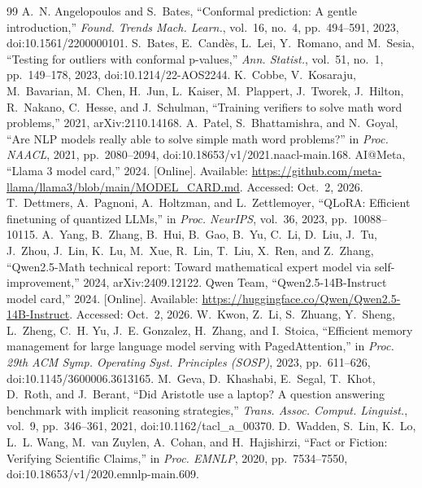 \documentclass[journal]{IEEEtran}
\begin{document}
\begin{thebibliography}{99}
 A.~N. Angelopoulos and S.~Bates, ``Conformal prediction: A gentle introduction,'' \emph{Found. Trends Mach. Learn.}, vol.~16, no.~4, pp.~494--591, 2023, doi:10.1561/2200000101.
 S.~Bates, E.~Cand\`es, L.~Lei, Y.~Romano, and M.~Sesia, ``Testing for outliers with conformal p-values,'' \emph{Ann. Statist.}, vol.~51, no.~1, pp.~149--178, 2023, doi:10.1214/22-AOS2244.
 K.~Cobbe, V.~Kosaraju, M.~Bavarian, M.~Chen, H.~Jun, L.~Kaiser, M.~Plappert, J.~Tworek, J.~Hilton, R.~Nakano, C.~Hesse, and J.~Schulman, ``Training verifiers to solve math word problems,'' 2021, arXiv:2110.14168.
 A.~Patel, S.~Bhattamishra, and N.~Goyal, ``Are NLP models really able to solve simple math word problems?'' in \emph{Proc. NAACL}, 2021, pp.~2080--2094, doi:10.18653/v1/2021.naacl-main.168.
 AI@Meta, ``Llama 3 model card,'' 2024. [Online]. Available: \url{https://github.com/meta-llama/llama3/blob/main/MODEL_CARD.md}. Accessed: Oct.~2, 2026.
 T.~Dettmers, A.~Pagnoni, A.~Holtzman, and L.~Zettlemoyer, ``QLoRA: Efficient finetuning of quantized LLMs,'' in \emph{Proc. NeurIPS}, vol.~36, 2023, pp.~10088--10115.
 A.~Yang, B.~Zhang, B.~Hui, B.~Gao, B.~Yu, C.~Li, D.~Liu, J.~Tu, J.~Zhou, J.~Lin, K.~Lu, M.~Xue, R.~Lin, T.~Liu, X.~Ren, and Z.~Zhang, ``Qwen2.5-Math technical report: Toward mathematical expert model via self-improvement,'' 2024, arXiv:2409.12122.
 Qwen Team, ``Qwen2.5-14B-Instruct model card,'' 2024. [Online]. Available: \url{https://huggingface.co/Qwen/Qwen2.5-14B-Instruct}. Accessed: Oct.~2, 2026.
 W.~Kwon, Z.~Li, S.~Zhuang, Y.~Sheng, L.~Zheng, C.~H. Yu, J.~E. Gonzalez, H.~Zhang, and I.~Stoica, ``Efficient memory management for large language model serving with PagedAttention,'' in \emph{Proc. 29th ACM Symp. Operating Syst. Principles (SOSP)}, 2023, pp.~611--626, doi:10.1145/3600006.3613165.
 M.~Geva, D.~Khashabi, E.~Segal, T.~Khot, D.~Roth, and J.~Berant, ``Did Aristotle use a laptop? A question answering benchmark with implicit reasoning strategies,'' \emph{Trans. Assoc. Comput. Linguist.}, vol.~9, pp.~346--361, 2021, doi:10.1162/tacl\_a\_00370.
 D.~Wadden, S.~Lin, K.~Lo, L.~L. Wang, M.~van Zuylen, A.~Cohan, and H.~Hajishirzi, ``Fact or Fiction: Verifying Scientific Claims,'' in \emph{Proc. EMNLP}, 2020, pp.~7534--7550, doi:10.18653/v1/2020.emnlp-main.609.
\end{thebibliography}
\end{document}
